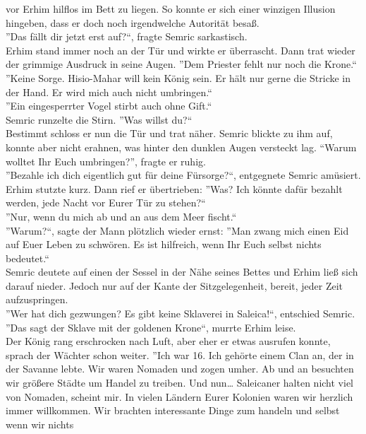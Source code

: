 vor Erhim hilflos im Bett zu liegen. So konnte er sich einer winzigen Illusion hingeben, dass er 
doch noch irgendwelche Autorität besaß. \\
''Das fällt dir jetzt erst auf?``, fragte Semric sarkastisch.\\
Erhim stand immer noch an der Tür und wirkte er überrascht. Dann trat wieder der grimmige 
Ausdruck in seine Augen. ''Dem Priester fehlt nur noch die Krone.``\\
''Keine Sorge. Hisio-Mahar will kein König sein. Er hält nur gerne die Stricke in der Hand. Er wird 
mich auch nicht umbringen.``\\
''Ein eingesperrter Vogel stirbt auch ohne Gift.``\\
Semric runzelte die Stirn. ''Was willst du?``\\
Bestimmt schloss er nun die Tür und trat näher. Semric blickte zu ihm auf, konnte aber nicht 
erahnen, was hinter den dunklen Augen versteckt lag. ``Warum wolltet Ihr Euch umbringen?'', 
fragte er ruhig.\\
''Bezahle ich dich eigentlich gut für deine Fürsorge?``, entgegnete Semric amüsiert.\\
Erhim stutzte kurz. Dann rief er übertrieben: ''Was? Ich könnte dafür bezahlt werden, jede Nacht 
vor 
Eurer Tür zu stehen?``\\
''Nur, wenn du mich ab und an aus dem Meer fischt.``\\
''Warum?``, sagte der Mann plötzlich wieder ernst: ''Man zwang mich einen Eid auf Euer Leben zu 
schwören. Es ist hilfreich, wenn Ihr Euch selbst nichts bedeutet.``\\
Semric deutete auf einen der Sessel in der Nähe seines Bettes und Erhim ließ sich darauf nieder. 
Jedoch nur auf der Kante der Sitzgelegenheit, bereit, jeder Zeit aufzuspringen.\\
''Wer hat dich gezwungen? Es gibt keine Sklaverei in Saleica!``, entschied Semric.\\
''Das sagt der Sklave mit der goldenen Krone``, murrte Erhim leise.\\
Der König rang erschrocken nach Luft, aber eher er etwas ausrufen konnte, sprach der Wächter schon 
weiter. ''Ich war 16. Ich gehörte einem Clan an, der in der Savanne lebte. Wir waren Nomaden und 
zogen umher. Ab und an besuchten wir größere Städte um Handel zu treiben. Und nun… Saleicaner 
halten nicht viel von Nomaden, scheint mir. In vielen Ländern Eurer Kolonien waren wir herzlich 
immer willkommen. Wir brachten interessante Dinge zum handeln und selbst wenn wir nichts 
